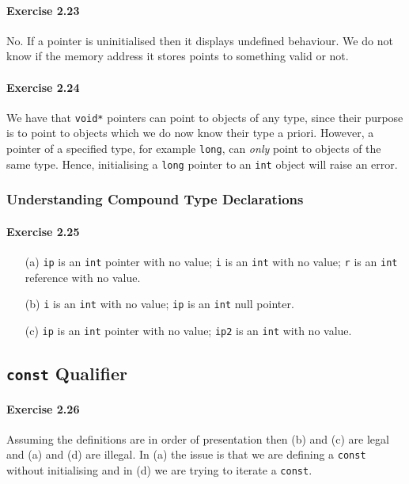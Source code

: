 \paragraph{Exercise 2.23}
No. If a pointer is uninitialised then it displays undefined behaviour. We do not know if the memory address it stores points to something valid or not.

\paragraph{Exercise 2.24}
We have that \texttt{void*} pointers can point to objects of any type, since their purpose is to point to objects which we do now know their type a priori. However, a pointer of a specified type, for example \texttt{long}, can \textit{only} point to objects of the same type. Hence, initialising a \texttt{long} pointer to an \texttt{int} object will raise an error.

\subsubsection{Understanding Compound Type Declarations}

\paragraph{Exercise 2.25}
\begin{itemize}
	\item [(a)]
		\texttt{ip} is an \texttt{int} pointer with no value; \texttt{i} is an \texttt{int} with no value; \texttt{r} is an \texttt{int} reference with no value.
	\item [(b)]
		\texttt{i} is an \texttt{int} with no value; \texttt{ip} is an \texttt{int} null pointer.
	\item [(c)]
		\texttt{ip} is an \texttt{int} pointer with no value; \texttt{ip2} is an \texttt{int} with no value.
\end{itemize}

\subsection{\texttt{const} Qualifier}

\paragraph{Exercise 2.26}
Assuming the definitions are in order of presentation then (b) and (c) are legal and (a) and (d) are illegal. In (a) the issue is that we are defining a \texttt{const} without initialising and in (d) we are trying to iterate a \texttt{const}.

